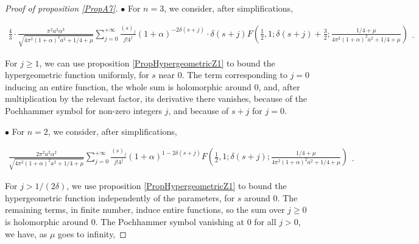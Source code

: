 \documentclass{jams-l}
\theoremstyle{definition}
\theoremstyle{remark}
\numberwithin{equation}{section}
\begin{document}
\begin{proof}[Proof of proposition \ref{PropA7}]
                \hspace{10pt} $\bullet$ For $n = 3$, we consider, after simplifications,
                
                    \[ \begin{array}{l}
                            \scriptstyle \frac{4}{3} \cdot \frac{\pi^2 a^2 \alpha^3}{\sqrt{4 \pi^2 \left( 1 + \alpha \right)^2 a^2 + 1/4 + \mu}} \sum\limits_{j=0}^{+ \infty} \frac{\left( s \right)_j}{j! 4^j} \left( 1 + \alpha \right)^{-2 \delta \left( s + j \right)} \cdot \delta \left( s + j \right) F \left( \frac{1}{2}, 1; \delta \left( s + j \right) + \frac{3}{2}; \frac{1/4 + \mu}{4 \pi^2 \left( 1 + \alpha \right)^2 a^2 + 1/4 + \mu} \right)
                        \end{array} . \]
                
                    \noindent For $j \geqslant 1$, we can use proposition \ref{PropHypergeometricZ1} to bound the hypergeometric function uniformly, for $s$ near $0$. The term corresponding to $j = 0$ inducing an entire function, the whole sum is holomorphic around $0$, and, after multiplication by the relevant factor, its derivative there vanishes, because of the Pochhammer symbol for non-zero integers $j$, and because of $s + j$ for $j = 0$.
                
                    \medskip
                
                \hspace{10pt} $\bullet$ For $n = 2$, we consider, after simplifications,
                
                    \[ \begin{array}{l}
                            \scriptstyle \frac{2 \pi^2 a^2 \alpha^2}{\sqrt{4 \pi^2 \left( 1 + \alpha \right)^2 a^2 + 1/4 + \mu}} \sum\limits_{j = 0}^{+ \infty} \frac{\left( s \right)_j}{j! 4^j} \left( 1 + \alpha \right)^{1 - 2 \delta \left( s + j \right)} F \left( \frac{1}{2}, 1; \delta \left( s + j \right); \frac{1/4 + \mu}{4 \pi^2 \left( 1 + \alpha \right)^2 a^2 + 1/4 + \mu} \right)
                        \end{array} . \]
                        
                    \noindent For $j > 1/\left( 2 \delta \right)$, we use proposition \ref{PropHypergeometricZ1} to bound the hypergeometric function independently of the parameters, for $s$ around $0$. The remaining terms, in finite number, induce entire functions, so the sum over $j \geqslant 0$ is holomorphic around $0$. The Pochhammer symbol vanishing at $0$ for all $j > 0$, we have, as $\mu$ goes to infinity,
                

\end{proof}
\end{document}
